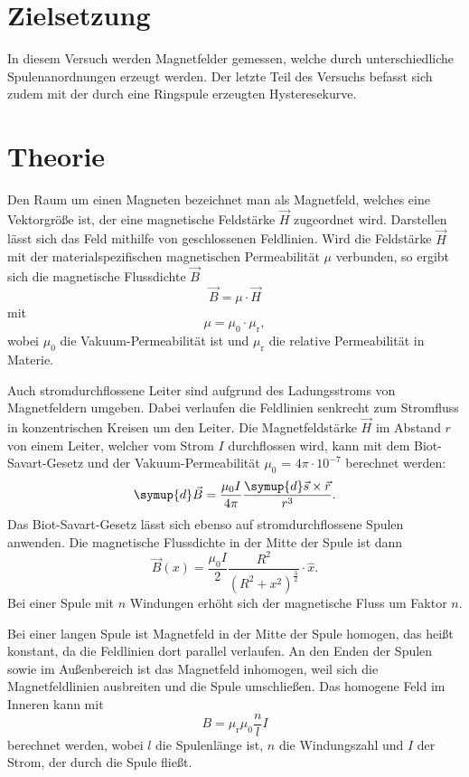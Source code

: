\section{Zielsetzung}
In diesem Versuch werden Magnetfelder gemessen, welche durch unterschiedliche Spulenanordnungen erzeugt werden.
Der letzte Teil des Versuchs befasst sich zudem mit der durch eine Ringspule erzeugten Hysteresekurve.

\section{Theorie}
Den Raum um einen Magneten bezeichnet man als Magnetfeld, welches eine Vektorgröße ist, der eine magnetische Feldstärke $\vec{H}$ zugeordnet wird. Darstellen lässt sich
das Feld mithilfe von geschlossenen Feldlinien. 
Wird die Feldstärke $\vec{H}$ mit der materialspezifischen magnetischen Permeabilität $\mu$ verbunden, so ergibt sich die magnetische Flussdichte $\vec{B}$
\begin{equation}
\vec{B} = \mu \cdot \vec{H}
\label{eqn:bmuh}
\end{equation}
mit
\begin{equation}
\mu = \mu_0 \cdot \mu_{\text{r}},
\end{equation}
wobei $\mu_0$ die Vakuum-Permeabilität ist und $\mu_{\text{r}}$ die relative Permeabilität in Materie.

Auch stromdurchflossene Leiter sind aufgrund des Ladungsstroms von Magnetfeldern umgeben. Dabei verlaufen die Feldlinien senkrecht zum Stromfluss in konzentrischen 
Kreisen um den Leiter. Die Magnetfeldstärke $\vec{H}$ im Abstand $r$ von einem Leiter, welcher vom Strom $I$ durchflossen wird, kann mit dem Biot-Savart-Gesetz und der 
Vakuum-Permeabilität $\mu_0$ = $4\pi \cdot 10^{-7}$ berechnet 
werden:
\begin{equation}
\symup{d}\vec{B} = \frac{\mu_0 I}{4 \pi} \frac{\symup{d}\vec{s} \times \vec{r}}{r^3}.
\end{equation}
Das Biot-Savart-Gesetz lässt sich ebenso auf stromdurchflossene Spulen anwenden. Die magnetische Flussdichte in der Mitte der Spule ist dann
\begin{equation}
\vec{B}(x) = \frac{\mu_0 I}{2} \frac{R^2}{(R^2 + x^2)^{\frac{3}{2}}} \cdot \hat{x}.
\end{equation}
Bei einer Spule mit $n$ Windungen erhöht sich der magnetische Fluss um Faktor $n$.

Bei einer langen Spule ist Magnetfeld in der Mitte der Spule homogen, das heißt konstant, da die Feldlinien dort parallel verlaufen. An den Enden der Spulen sowie 
im Außenbereich ist das Magnetfeld inhomogen, weil sich die Magnetfeldlinien ausbreiten und die Spule umschließen. Das homogene Feld im Inneren kann mit 
\begin{equation}
B = \mu_{\text{r}}\mu_0 \frac{n}{l}I
\end{equation}
berechnet werden, wobei $l$ die Spulenlänge ist, $n$ die Windungszahl und $I$ der Strom, der durch die Spule fließt.

